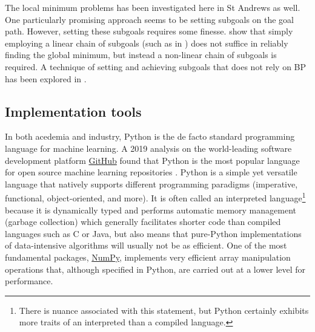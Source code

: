 The local minimum problems has been investigated here in St Andrews as well. 
One particularly promising approach seems to be setting subgoals on the goal path.
However, setting these subgoals requires some finesse.
\textcite{lewis1999} show that simply employing a linear chain of subgoals (such as in \textcite{gorse1997}) does not suffice in reliably finding the global minimum, but instead a non-linear chain of subgoals is required.
A technique of setting and achieving subgoals that does not rely on BP has been explored in \textcite{weir2000}.

\subsection{Implementation tools}
In both acedemia and industry, Python is the de facto standard programming language for machine learning. 
A 2019 analysis on the world-leading software development platform \href{https://www.github.com/}{GitHub} found that Python is the most popular language for open source machine learning repositories \cite{elliott2019}.
Python is a simple yet versatile language that natively supports different programming paradigms (imperative, functional, object-oriented, and more).
It is often called an interpreted language\footnote{There is nuance associated with this statement, but Python certainly exhibits more traits of an interpreted than a compiled language.} because it is dynamically typed and performs automatic memory management (garbage collection) which generally facilitates shorter code than compiled languages such as C or Java, but also means that pure-Python implementations of data-intensive algorithms will usually not be as efficient.
One of the most fundamental packages, \href{https://numpy.org/}{NumPy}, implements very efficient array manipulation operations that, although specified in Python, are carried out at a lower level for performance.

